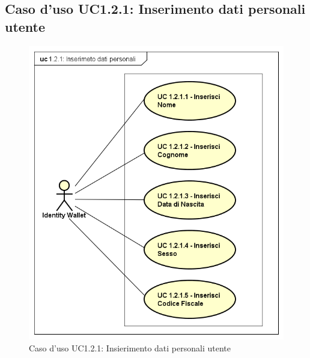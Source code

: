 \subsection{Caso d'uso UC1.2.1: Inserimento dati personali utente}
\begin{figure}[h]
	\centering
	\includegraphics[scale=0.50]{immagini/usecase/UC121_InserimentoDatiPersonali}
	\caption{Caso d'uso UC1.2.1: Insierimento dati personali utente}
\end{figure}
